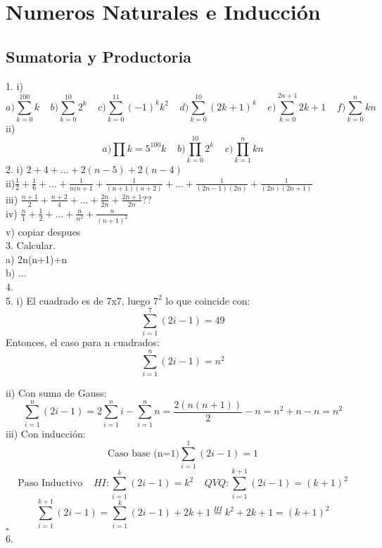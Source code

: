 \documentclass[a4paper,11pt]{article}
\begin{document}
\section{Numeros Naturales e Inducción}
\subsection{Sumatoria y Productoria}
1. i) \[a)\sum_{k=0}^{100} k\;\;\;\;b) \sum_{k=0}^{10} 2^k \;\;\;\;c)\sum_{k=0}^{11} (-1)^k k^2\;\;\;\;d) \sum_{k=0}^{10} (2k+1)^k \;\;\;\;e)\sum_{k=0}^{2n+1} 2k+1 \;\;\;\;f)\sum_{k=0}^{n} kn  \]
ii) \[a)\prod{k=5}^{100} k\;\;\;\;b) \prod_{k=0}^{10} 2^k \;\;\;\;c)\prod_{k=1}^{n} kn \]
2. i) $2+4+...+2(n-5)+2(n-4)$\\
ii)$\frac{1}{2}+\frac{1}{6}+...+\frac{1}{n(n+1}+\frac{1}{(n+1)(n+2)}+...+\frac{1}{(2n-1)(2n)}+\frac{1}{(2n)(2n+1)}$\\
iii) $\frac{n+1}{2}+\frac{n+2}{4}+...+\frac{2n}{2n}+\frac{2n+1}{2n}??$\\
iv) $\frac{n}{1}+\frac{1}{2}+...+\frac{n}{n^2}+\frac{n}{(n+1)^2}$\\
v) copiar despues\\

3. Calcular.\\
a) 2n(n+1)+n\\
b) ...\\
4.\\
5. i) El cuadrado es de 7x7, luego $7^2$ lo que coincide con:
\[\text{} \sum_{i=1}^{7} (2i-1) = 49 \]
Entonces, el caso para n cuadrados:
\[\text{} \sum_{i=1}^{n} (2i-1) = n^2 \]

ii) Con suma de Gauss:
\[\sum_{i=1}^{n} (2i-1) =  2\sum_{i=1}^{n} i -  \sum_{i=1}^{n} n = \frac{2(n(n+1))}{2} - n = n^2+n-n = n^2\]
iii) Con inducción:
\[\text{Caso base (n=1)} \sum_{i=1}^{1} (2i-1) = 1 \]
\[\text{Paso Inductivo}\;\;\;\; HI: \sum_{i=1}^{k} (2i-1) = k^2\;\;\;\; QVQ: \sum_{i=1}^{k+1} (2i-1) = (k+1)^2 \]
\[\sum_{i=1}^{k+1} (2i-1) = \sum_{i=1}^{k} (2i-1) + 2k + 1 \stackrel{HI}{=} k^2 + 2k + 1 = (k+1)^2 \]
\hfill$\square $\\
6.
\end{document}
